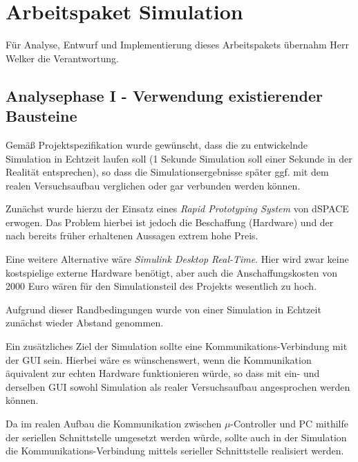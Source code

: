 

\chapter{Arbeitspaket Simulation}
Für Analyse, Entwurf und Implementierung dieses Arbeitspakets übernahm Herr Welker die Verantwortung.

\section{Analysephase I - Verwendung existierender Bausteine}
Gemäß Projektspezifikation wurde gewünscht, dass die zu entwickelnde Simulation in Echtzeit laufen soll (1 Sekunde Simulation soll einer Sekunde in der Realität entsprechen), so dass die Simulationsergebnisse später ggf. mit dem realen Versuchsaufbau verglichen oder gar verbunden werden können. 

Zunächst wurde hierzu der Einsatz eines \textit{Rapid Prototyping System} von dSPACE erwogen. %
Das Problem hierbei ist jedoch die Beschaffung (Hardware) und der nach bereits früher erhaltenen Aussagen extrem hohe Preis. 

Eine weitere Alternative wäre \textit{Simulink Desktop Real-Time}. %
Hier wird zwar keine kostspielige externe Hardware benötigt, aber auch die Anschaffungskosten von 2000 Euro %
wären für den Simulationsteil des Projekts wesentlich zu hoch. 

Aufgrund dieser Randbedingungen wurde von einer Simulation in Echtzeit zunächst wieder Abstand genommen.

Ein zusätzliches Ziel der Simulation sollte eine Kommunikations-Verbindung mit der GUI sein. Hierbei wäre es wünschenswert, wenn die Kommunikation äquivalent zur echten Hardware funktionieren würde, so dass mit ein- und derselben GUI sowohl Simulation als realer Versuchsaufbau angesprochen werden können. 

Da im realen Aufbau die Kommunikation zwischen $\mu$-Controller und PC mithilfe der seriellen Schnittstelle umgesetzt werden würde, sollte auch in der Simulation die Kommunikations-Verbindung mittels serieller Schnittstelle realisiert werden. 

